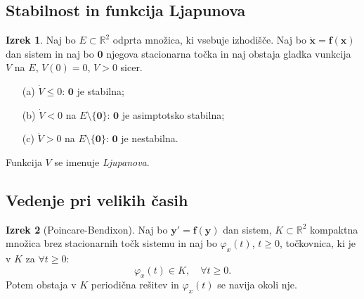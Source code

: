 \documentclass[11pt]{article}
\newcommand{\R}{\mathbb{R}}
\newcommand{\f}{\mathbf{f}}
\newcommand{\x}{\mathbf{x}}
\newcommand{\y}{\mathbf{y}}
\newcommand{\set}[1]{\{#1\}}
\newcommand{\0}{\mathbf{0}}
\theoremstyle{definition}
\theoremstyle{definition}
\theoremstyle{definition}
\newtheorem{izrek}{Izrek}[section]
\theoremstyle{definition}
\begin{document}

\subsection{Stabilnost in funkcija Ljapunova}
\vspace{0.5cm}

\begin{izrek}

Naj bo $E \subset \R^2$ odprta množica, ki vsebuje izhodišče. Naj bo $\dot{\x}=\f(\x)$ dan sistem in naj bo $\0$ njegova stacionarna točka in naj obstaja gladka vunkcija $V$ na $E$, $V(0)=0$, $V>0$ sicer.
\begin{enumerate}
	\item[(a)] $\dot{V} \leq 0$: $\0$ je stabilna;
	\item[(b)] $\dot{V}<0$ na $E \setminus \set{\0}$: $\0$ je asimptotsko stabilna;
	\item[(c)] $\dot{V}>0$ na $E \setminus \set{\0}$: $\0$ je nestabilna. 
\end{enumerate}
Funkcija $V$ se imenuje \textit{Ljupanova}.

\end{izrek}
\vspace{0.5cm}


\subsection{Vedenje pri velikih časih}
\vspace{0.5cm}

\begin{izrek}[Poincare-Bendixon]

Naj bo $\y' = \f(\y)$ dan sistem, $K \subset \R^2$ kompaktna množica brez stacionarnih točk sistemu in naj bo $\varphi_x(t)$, $t \geq 0$, točkovnica, ki je v $K$ za $\forall t \geq 0$:
$$\varphi_x(t) \in K, \quad \forall t \geq 0.$$
Potem obstaja v $K$ periodična rešitev in $\varphi_x(t)$ se navija okoli nje.

\end{izrek}
\vspace{0.5cm}

\end{document}
